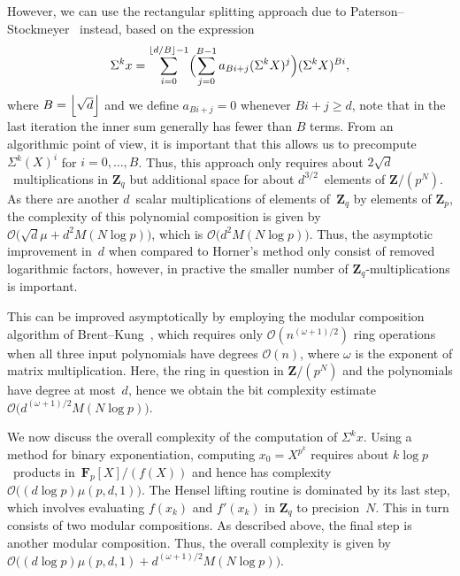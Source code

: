 However, we can use the rectangular splitting approach due to 
Paterson--Stockmeyer~\citep{PatersonStockmeyer1973} instead, based 
on the expression 
\begin{equation}
\Sigma^k x = \sum_{i=0}^{\left\lfloor d/B\right\rfloor-1} \Bigl( \sum_{j=0}^{B-1} a_{Bi + j} (\Sigma^k X)^j  \Bigr) (\Sigma ^k X)^{Bi},
\end{equation}
where $B = \left\lfloor\sqrt{d}\right\rfloor$ and we define $a_{Bi + j} = 0$ whenever 
$Bi + j \geq d$, note that in the last iteration the inner sum generally 
has fewer than $B$ terms.  From an algorithmic point of view, it is 
important that this allows us to precompute $\Sigma^k(X)^i$ for 
$i = 0, \dotsc, B$.  Thus, this approach only requires about 
\mbox{$2 \sqrt{d}$}~multiplications in $\mathbf{Z}_q$ but additional space 
for about $d^{3/2}$~elements of $\mathbf{Z}/(p^N)$.  As there are another 
$d$~scalar multiplications of elements of~$\mathbf{Z}_q$ by elements of 
$\mathbf{Z}_p$, the complexity of this polynomial composition 
is given by $\mathcal{O}\bigl(\sqrt{d} \mu + d^2 M(N \log p)\bigr)$, which 
is $\mathcal{O}\bigl(d^2 M(N \log p)\bigr)$.  Thus, the asymptotic 
improvement in~$d$ when compared to Horner's method 
only consist of removed logarithmic factors, however, in practive the smaller 
number of $\mathbf{Z}_q$-multiplications is important.

This can be improved asymptotically by employing the modular composition 
algorithm of Brent--Kung~\citep{BrentKung1978}, which requires only 
$\mathcal{O}(n^{(\omega+1)/2})$ ring operations when all three input 
polynomials have degrees $\mathcal{O}(n)$, where $\omega$ is the exponent 
of matrix multiplication.  Here, the ring in question in $\mathbf{Z}/(p^N)$ 
and the polynomials have degree at most~$d$, hence we obtain the bit 
complexity estimate $\mathcal{O}(d^{(\omega + 1)/2} M(N \log p)\bigr)$.

We now discuss the overall complexity of the computation of $\Sigma^k x$.
Using a method for binary exponentiation, computing \mbox{$x_0 = X^{p^k}$} 
requires about $k \log p$~products in~$\mathbf{F}_p[X] / (f(X))$ and hence 
has complexity $\mathcal{O}\bigl((d \log p) \mu(p,d,1)\bigr)$.  The Hensel 
lifting routine is dominated by its last step, which involves evaluating 
$f(x_k)$ and $f'(x_k)$ in $\mathbf{Z}_q$ to precision~$N$.  This in turn 
consists of two modular compositions.  As described above, the final step 
is another modular composition.  Thus, the overall complexity is given by 
$\mathcal{O}\bigl( (d \log p) \mu(p,d,1) 
+ d^{(\omega + 1)/2} M(N \log p) \bigr)$.

